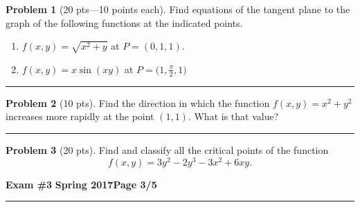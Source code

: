 \documentclass[12pt]{article}
\theoremstyle{definition}
\newtheorem{problem}{Problem}
\begin{document}
\bigskip
\begin{problem}[20 pts---10 points each] Find equations of the tangent plane to the graph of the following functions at the indicated points.
\begin{enumerate}
  \item $f(x,y) = \sqrt{x^2+y}$ at $P=(0,1,1)$.
  \vspace{1cm}
  \begin{flushright}
  \end{flushright}
  \item $f(x,y) = x\sin(xy)$ at $P=\big(1,\frac{\pi}{2},1 \big)$
  \vspace{1cm}
  \begin{flushright}
  \end{flushright}
\end{enumerate}
\end{problem}
\hrule

\begin{problem}[10 pts]
Find the direction in which the function $f(x,y)= x^2 + y^2$ increases more rapidly at the point $(1,1)$.  What is that value?

\vspace{2cm}
\begin{flushright}
  \end{flushright}
\end{problem}
\hrule

\begin{problem}[20 pts]
Find and classify all the critical points of the function 
\begin{equation*}
f(x,y) = 3y^2 - 2y^3-3x^2+6xy.
\end{equation*}
\end{problem}

\newpage

\hfill{\large\bf Exam \#3}\hfill{\large\bf
  Spring 2017}\hfill{\large\bf Page 3/5}\hrule
\end{document}
